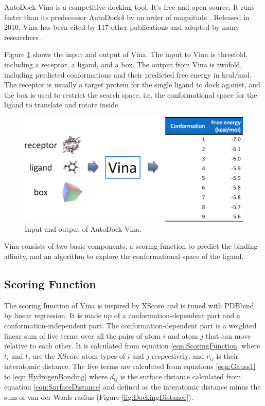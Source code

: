AutoDock Vina \citep{595-2010} is a competitive docking tool. It's free and open source. It runs faster than its predecessor AutoDock4 \citep{596-2009} by an order of magnitude \citep{556-2010}. Released in 2010, Vina has been cited by 117 other publications and adopted by many researchers \citep{609-2010}.

Figure \ref{fig:VinaInputOutput} shows the input and output of Vina. The input to Vina is threefold, including a receptor, a ligand, and a box. The output from Vina is twofold, including predicted conformations and their predicted free energy in kcal/mol. The receptor is usually a target protein for the single ligand to dock against, and the box is used to restrict the search space, i.e. the conformational space for the ligand to translate and rotate inside.

\begin{figure}
\centering
\includegraphics[width=\textwidth]{VirtualScreening/Figures/VinaInputOutput.png}
\caption{Input and output of AutoDock Vina.}
\label{fig:VinaInputOutput}
\end{figure}

Vina consists of two basic components, a scoring function to predict the binding affinity, and an algorithm to explore the conformational space of the ligand.

\subsection{Scoring Function}
\label{sec:VinaScoringFunction}

The scoring function of Vina is inspired by XScore \citep{573-2002} and is tuned with PDBbind \citep{529-2004,530-2005} by linear regression. It is made up of a conformation-dependent part and a conformation-independent part. The conformation-dependent part is a weighted linear sum of five terms over all the pairs of atom $i$ and atom $j$ that can move relative to each other. It is calculated from equation \eqref{eqn:ScoringFunction} where $t_i$ and $t_j$ are the XScore atom types of $i$ and $j$ respectively, and $r_{ij}$ is their interatomic distance. The five terms are calculated from equations \eqref{eqn:Gauss1} to \eqref{eqn:HydrogenBonding} where $d_{ij}$ is the surface distance calculated from equation \eqref{eqn:SurfaceDistance} and defined as the interatomic distance minus the sum of van der Waals radius (Figure \ref{fig:DockingDistance}).


